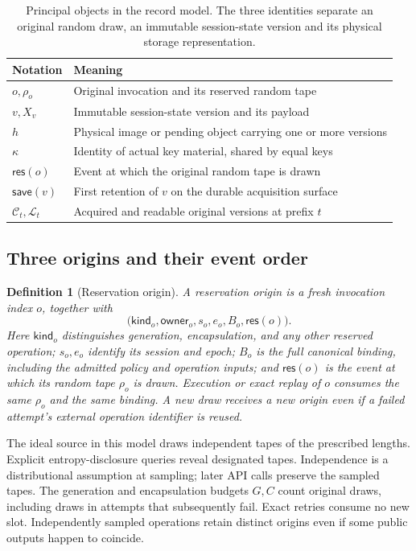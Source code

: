 \documentclass[pdflatex]{sn-jnl}
\theoremstyle{thmstyleone}
\theoremstyle{thmstylethree}
\newtheorem{definition}[theorem]{Definition}
\theoremstyle{thmstyletwo}
\begin{document}
\begin{table}[t]
\centering
\caption{Principal objects in the record model. The three identities separate
an original random draw, an immutable session-state version and its physical
storage representation.}
\label{tab:record-notation}
\small
\begin{tabularx}{\linewidth}{@{}>{\raggedright\arraybackslash}p{.25\linewidth}X@{}}
\toprule
Notation & Meaning\\
\midrule
$o,\rho_o$ & Original invocation and its reserved random tape\\
$v,X_v$ & Immutable session-state version and its payload\\
$h$ & Physical image or pending object carrying one or more versions\\
$\kappa$ & Identity of actual key material, shared by equal keys\\
$\mathsf{res}(o)$ & Event at which the original random tape is drawn\\
$\mathsf{save}(v)$ & First retention of $v$ on the durable acquisition surface\\
$\mathcal C_t,\mathcal L_t$ & Acquired and readable original versions at prefix $t$\\
\bottomrule
\end{tabularx}
\end{table}

\subsection{Three origins and their event order}

\begin{definition}[Reservation origin]
\label{def:reservation-origin}
A reservation origin is a fresh invocation index $o$, together with
\[
  \bigl(\mathsf{kind}_o,\mathsf{owner}_o,s_o,e_o,B_o,
        \mathsf{res}(o)\bigr).
\]
Here $\mathsf{kind}_o$ distinguishes generation, encapsulation, and any other
reserved operation; $s_o,e_o$ identify its session and epoch; $B_o$ is the full
canonical binding, including the admitted policy and operation inputs; and
$\mathsf{res}(o)$ is the event at which its random tape $\rho_o$ is drawn.
Execution or exact replay of $o$ consumes the same $\rho_o$ and the same
binding.  A new draw receives a new origin even if a failed attempt's external
operation identifier is reused.
\end{definition}

The ideal source in this model draws independent tapes of the prescribed
lengths.  Explicit entropy-disclosure queries reveal designated tapes.
Independence is a distributional assumption at sampling; later API calls
preserve the sampled tapes. The generation and encapsulation budgets
$G,C$ count original draws, including draws in attempts that subsequently
fail.  Exact retries consume no new slot.  Independently sampled operations
retain distinct origins even if some public outputs happen to coincide.
\end{document}

